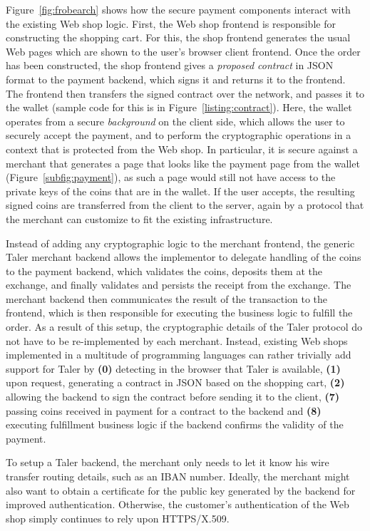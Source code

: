 \documentclass{IEEEtran}
\begin{document}
Figure~\ref{fig:frobearch} shows how the secure payment components
interact with the existing Web shop logic.  First, the Web shop
frontend is responsible for constructing the shopping cart.  For this,
the shop frontend generates the usual Web pages which are shown to the
user's browser client frontend.  Once the order has been constructed,
the shop frontend gives a {\em proposed contract} in JSON format to the
payment backend, which signs it and returns it to the frontend.  The frontend
then transfers the signed contract over the network, and passes it to the
wallet (sample code for this is in Figure~\ref{listing:contract}).
Here, the wallet operates from a secure {\em background} on the client side,
which allows the user to securely accept the payment, and to perform
the cryptographic operations in a context that is protected from the
Web shop. In particular, it is secure against a merchant that
generates a page that looks like the payment page from the wallet
(Figure~\ref{subfig:payment}), as such a page would still not have
access to the private keys of the coins that are in the wallet.  If
the user accepts, the resulting signed coins are transferred from the
client to the server, again by a protocol that the merchant can
customize to fit the existing infrastructure.

Instead of adding any cryptographic logic to the merchant frontend,
the generic Taler merchant backend allows the implementor to delegate
handling of the coins to the payment backend, which validates the
coins, deposits them at the exchange, and finally validates and
persists the receipt from the exchange.  The merchant backend then
communicates the result of the transaction to the front\-end, which is
then responsible for executing the business logic to fulfill the
order.  As a result of this setup, the cryptographic details of the
Taler protocol do not have to be re-implemented by each merchant.
Instead, existing Web shops implemented in a multitude of programming
languages can rather trivially add support for Taler by {\bf (0)}
detecting in the browser that Taler is available, {\bf (1)} upon
request, generating a contract in JSON based on the shopping cart,
{\bf (2)} allowing the backend to sign the contract before sending it
to the client, {\bf (7)} passing coins received in payment for a
contract to the backend and {\bf (8)} executing fulfillment business
logic if the backend confirms the validity of the payment.

To setup a Taler backend, the merchant only needs to let it know his wire
transfer routing details, such as an IBAN number.  Ideally, the
merchant might also want to obtain a certificate for the public key
generated by the backend for improved authentication.  Otherwise, the
customer's authentication of the Web shop simply continues to rely
upon HTTPS/X.509.
\end{document}
